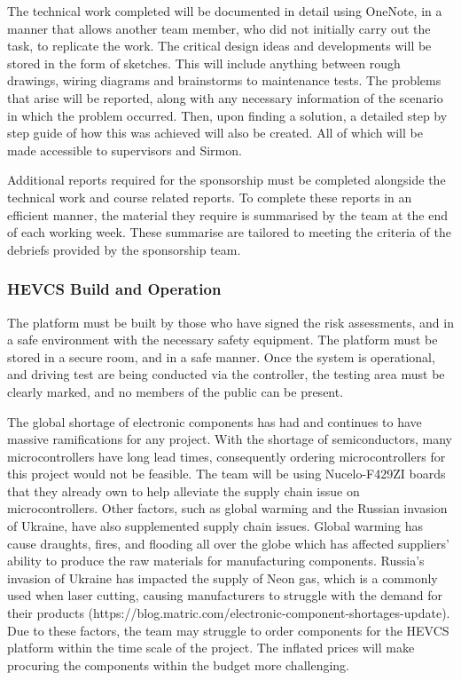 \documentclass [12pt]{article}
\begin{document}
The technical work completed will be documented in detail using OneNote, in a manner that allows another team member, who did not initially carry out the task, to replicate the work. The critical design ideas and developments will be stored in the form of sketches. This will include anything between rough drawings, wiring diagrams and brainstorms to maintenance tests. The problems that arise will be reported, along with any necessary information of the scenario in which the problem occurred. Then, upon finding a solution, a detailed step by step guide of how this was achieved will also be created. All of which will be made accessible to supervisors and Sirmon.

Additional reports required for the sponsorship must be completed alongside the technical work and course related reports. To complete these reports in an efficient manner, the material they require is summarised by the team at the end of each working week. These summarise are tailored to meeting the criteria of the debriefs provided by the sponsorship team.

\subsubsection{HEVCS Build and Operation}

The platform must be built by those who have signed the risk assessments, and in a safe environment with the necessary safety equipment. The platform must be stored in a secure room, and in a safe manner. Once the system is operational, and driving test are being conducted via the controller, the testing area must be clearly marked, and no members of the public can be present.

The global shortage of electronic components has had and continues to have massive ramifications for any project. With the shortage of semiconductors, many microcontrollers have long lead times, consequently ordering microcontrollers for this project would not be feasible. The team will be using Nucelo-F429ZI boards that they already own to help alleviate the supply chain issue on microcontrollers. Other factors, such as global warming and the Russian invasion of Ukraine, have also supplemented supply chain issues. Global warming has cause draughts, fires, and flooding all over the globe which has affected suppliers’ ability to produce the raw materials for manufacturing components. Russia’s invasion of Ukraine has impacted the supply of Neon gas, which is a commonly used when laser cutting, causing manufacturers to struggle with the demand for their products (https://blog.matric.com/electronic-component-shortages-update). Due to these factors, the team may struggle to order components for the HEVCS platform within the time scale of the project. The inflated prices will make procuring the components within the budget more challenging.
\end{document}
